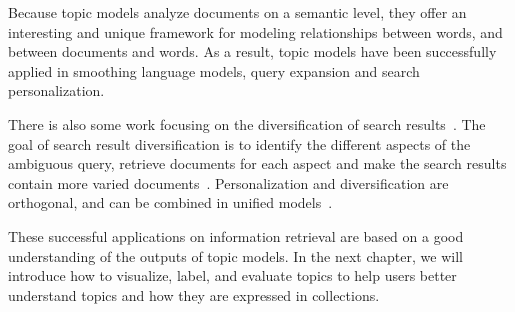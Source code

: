 Because topic models analyze documents on a semantic level, they offer
an interesting and unique framework for modeling relationships between words, and between documents and words.
As a result, topic models have been
successfully applied in smoothing language models, query expansion and search personalization.

There is also some work focusing on the diversification of search
results~\citep{Dang-2013,Santos-2015}. The goal of search result
diversification is to identify the different aspects of the ambiguous
query, retrieve documents for each aspect and make the search results
contain more varied documents~\citep{Dang-2013}. Personalization and
diversification are orthogonal, and can be combined in unified
models~\citep{Vallet-2012,Liang-2014}.

These successful applications on information retrieval are based on a good
understanding of the outputs of topic models. In the next chapter, we
will introduce how to visualize, label, and evaluate topics to
help users better understand topics and how they are expressed in collections.
